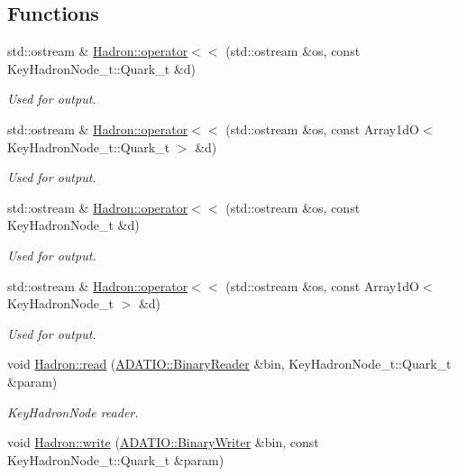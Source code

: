 \subsection*{Functions}
\begin{DoxyCompactItemize}
\item 
std\+::ostream \& \mbox{\hyperlink{namespaceHadron_a0c52fe94d4afb343c44206908152316e}{Hadron\+::operator$<$$<$}} (std\+::ostream \&os, const Key\+Hadron\+Node\+\_\+t\+::\+Quark\+\_\+t \&d)
\begin{DoxyCompactList}\small\item\em Used for output. \end{DoxyCompactList}\item 
std\+::ostream \& \mbox{\hyperlink{namespaceHadron_adc0e10e53889cf8575df386122424913}{Hadron\+::operator$<$$<$}} (std\+::ostream \&os, const Array1dO$<$ Key\+Hadron\+Node\+\_\+t\+::\+Quark\+\_\+t $>$ \&d)
\begin{DoxyCompactList}\small\item\em Used for output. \end{DoxyCompactList}\item 
std\+::ostream \& \mbox{\hyperlink{namespaceHadron_accc8a0a89713671c3a48ac45536eac45}{Hadron\+::operator$<$$<$}} (std\+::ostream \&os, const Key\+Hadron\+Node\+\_\+t \&d)
\begin{DoxyCompactList}\small\item\em Used for output. \end{DoxyCompactList}\item 
std\+::ostream \& \mbox{\hyperlink{namespaceHadron_a243db37c66ec71b086f54a64d62fa659}{Hadron\+::operator$<$$<$}} (std\+::ostream \&os, const Array1dO$<$ Key\+Hadron\+Node\+\_\+t $>$ \&d)
\begin{DoxyCompactList}\small\item\em Used for output. \end{DoxyCompactList}\item 
void \mbox{\hyperlink{namespaceHadron_a60758467521910899dec197e7fbc0ab4}{Hadron\+::read}} (\mbox{\hyperlink{classADATIO_1_1BinaryReader}{A\+D\+A\+T\+I\+O\+::\+Binary\+Reader}} \&bin, Key\+Hadron\+Node\+\_\+t\+::\+Quark\+\_\+t \&param)
\begin{DoxyCompactList}\small\item\em Key\+Hadron\+Node reader. \end{DoxyCompactList}\item 
void \mbox{\hyperlink{namespaceHadron_ae47780c59de1d15679cc11611947b313}{Hadron\+::write}} (\mbox{\hyperlink{classADATIO_1_1BinaryWriter}{A\+D\+A\+T\+I\+O\+::\+Binary\+Writer}} \&bin, const Key\+Hadron\+Node\+\_\+t\+::\+Quark\+\_\+t \&param)

\end{DoxyCompactItemize}
